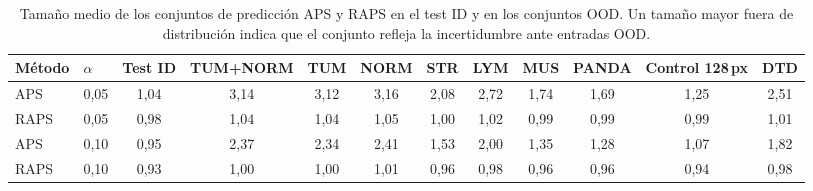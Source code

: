 \begin{table}[tbp]
\centering
\scriptsize
\setlength{\tabcolsep}{3pt}
\caption{Tamaño medio de los conjuntos de predicción APS y RAPS en el test ID y en los conjuntos OOD. Un tamaño mayor fuera de distribución indica que el conjunto refleja la incertidumbre ante entradas OOD.}
\label{tab:conforme-tamano-ood}
\begin{tabular}{llcccccccccc}
\toprule
Método & $\alpha$ & Test ID & TUM+NORM & TUM & NORM & STR & LYM & MUS & PANDA & Control 128\,px & DTD \\
\midrule
APS & 0{,}05 & 1{,}04 & 3{,}14 & 3{,}12 & 3{,}16 & 2{,}08 & 2{,}72 & 1{,}74 & 1{,}69 & 1{,}25 & 2{,}51 \\
RAPS & 0{,}05 & 0{,}98 & 1{,}04 & 1{,}04 & 1{,}05 & 1{,}00 & 1{,}02 & 0{,}99 & 0{,}99 & 0{,}99 & 1{,}01 \\
APS & 0{,}10 & 0{,}95 & 2{,}37 & 2{,}34 & 2{,}41 & 1{,}53 & 2{,}00 & 1{,}35 & 1{,}28 & 1{,}07 & 1{,}82 \\
RAPS & 0{,}10 & 0{,}93 & 1{,}00 & 1{,}00 & 1{,}01 & 0{,}96 & 0{,}98 & 0{,}96 & 0{,}96 & 0{,}94 & 0{,}98 \\
\bottomrule
\end{tabular}
\end{table}

